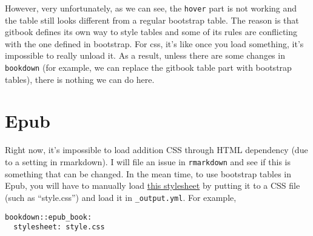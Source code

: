 \documentclass[]{book}
\begin{document}
However, very unfortunately, as we can see, the \texttt{hover} part is
not working and the table still looks different from a regular bootstrap
table. The reason is that gitbook defines its own way to style tables
and some of its rules are conflicting with the one defined in bootstrap.
For css, it's like once you load something, it's impossible to really
unload it. As a result, unless there are some changes in
\texttt{bookdown} (for example, we can replace the gitbook table part
with bootstrap tables), there is nothing we can do here.

\hypertarget{epub}{%
\section{Epub}\label{epub}}

Right now, it's impossible to load addition CSS through HTML dependency
(due to a setting in rmarkdown). I will file an issue in
\texttt{rmarkdown} and see if this is something that can be changed. In
the mean time, to use bootstrap tables in Epub, you will have to
manually load
\href{https://github.com/haozhu233/kableExtra/blob/master/inst/bootstrapTable-3.3.7/bootstrapTable.min.css}{this
stylesheet} by putting it to a CSS file (such as ``style.css'') and load
it in \texttt{\_output.yml}. For example,

\begin{verbatim}
bookdown::epub_book: 
  stylesheet: style.css
\end{verbatim}


\end{document}

